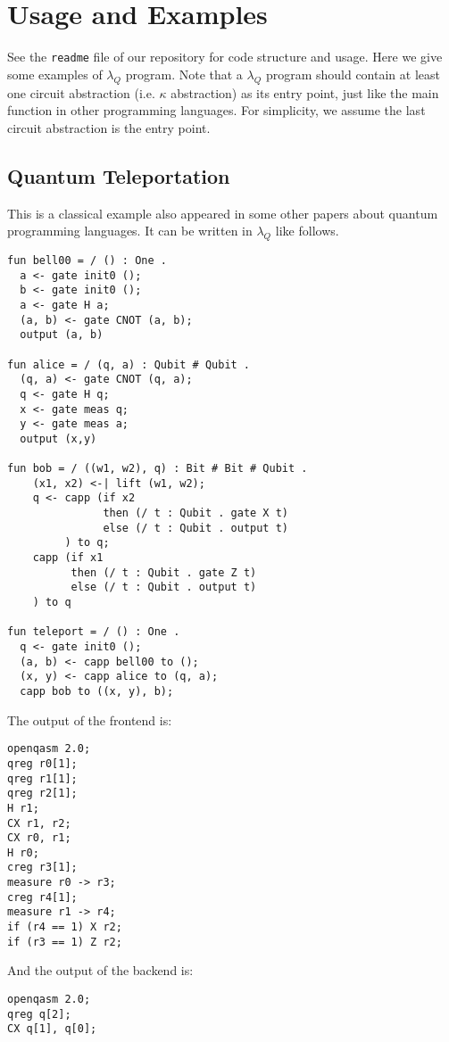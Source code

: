 \section{Usage and Examples}

See the \texttt{readme} file of our repository for code structure and usage.
Here we give some examples of $\lambda_Q$ program.
Note that a $\lambda_Q$ program should contain at least one circuit abstraction (i.e. $\kappa$ abstraction) as its entry point, just like the main function in other programming languages.
For simplicity, we assume the last circuit abstraction is the entry point.


\subsection{Quantum Teleportation}

This is a classical example also appeared in some other papers about quantum programming languages.
It can be written in $\lambda_Q$ like follows.

\begin{lstlisting}[language=Lambda]
fun bell00 = / () : One .
  a <- gate init0 ();
  b <- gate init0 ();
  a <- gate H a;
  (a, b) <- gate CNOT (a, b);
  output (a, b)

fun alice = / (q, a) : Qubit # Qubit .
  (q, a) <- gate CNOT (q, a);
  q <- gate H q;
  x <- gate meas q;
  y <- gate meas a;
  output (x,y)

fun bob = / ((w1, w2), q) : Bit # Bit # Qubit .
    (x1, x2) <-| lift (w1, w2);
    q <- capp (if x2
               then (/ t : Qubit . gate X t)
               else (/ t : Qubit . output t)
         ) to q;
    capp (if x1
          then (/ t : Qubit . gate Z t)
          else (/ t : Qubit . output t)
    ) to q

fun teleport = / () : One .
  q <- gate init0 ();
  (a, b) <- capp bell00 to ();
  (x, y) <- capp alice to (q, a);
  capp bob to ((x, y), b);
\end{lstlisting}

The output of the frontend is:
\begin{lstlisting}[language=lambda]
openqasm 2.0;
qreg r0[1];
qreg r1[1];
qreg r2[1];
H r1;
CX r1, r2;
CX r0, r1;
H r0;
creg r3[1];
measure r0 -> r3;
creg r4[1];
measure r1 -> r4;
if (r4 == 1) X r2;
if (r3 == 1) Z r2;
\end{lstlisting}

And the output of the backend is:
\begin{lstlisting}[language=lambda]
openqasm 2.0;
qreg q[2];
CX q[1], q[0];
\end{lstlisting}

